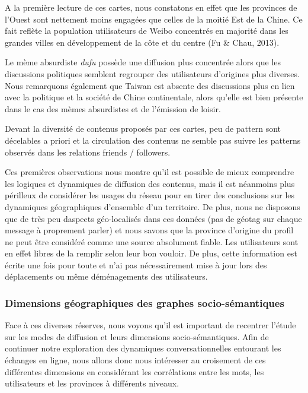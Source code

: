 A la premi\`ere lecture de ces cartes, nous constatons en effet que les
provinces de l{\textquoteright}Ouest sont nettement moins engag\'ees
que celles de la moiti\'e Est de la Chine. Ce fait refl\`ete la
population utilisateurs de Weibo concentr\'es en majorit\'e dans les
grandes villes en d\'eveloppement de la c\^ote et du centre (Fu \&
Chau, 2013). 

Le m\`eme absurdiste \textit{dufu }poss\`ede une diffusion plus
concentr\'ee alors que les discussions politiques semblent regrouper
des utilisateurs d{\textquoteright}origines plus diverses. Nous
remarquons \'egalement que Taiwan est absente des discussions plus en
lien avec la politique et la soci\'et\'e de Chine continentale, alors
qu{\textquoteright}elle est bien pr\'esente dans le cas des m\`emes
absurdistes et de l{\textquoteright}\'emission de loisir. 

Devant la diversit\'e de contenus propos\'es par ces cartes, peu de
pattern sont d\'ecelables a priori et la circulation des contenus ne
semble pas suivre les patterns observ\'es dans les relations friends /
followers.


Ces premi\`eres observations nous montre qu{\textquoteright}il est
possible de mieux comprendre les logiques et dynamiques de diffusion
des contenus, mais il est n\'eanmoins plus p\'erilleux de consid\'erer
les usages du r\'eseau pour en tirer des conclusions sur les dynamiques
g\'eographiques d{\textquoteright}ensemble d{\textquoteright}un
territoire. De plus, nous ne disposons que de tr\`es peu
d{\textquotesingle}aspects
{\textquotedbl}g\'eo-localis\'es{\textquotedbl} dans ces donn\'ees (pas
de g\'eotag sur chaque message \`a proprement parler) et nous savons
que la province d{\textquoteright}origine du profil ne peut \^etre
consid\'er\'e comme une source absolument fiable. Les utilisateurs sont
en effet libres de la remplir selon leur bon vouloir. De plus, cette
information est \'ecrite une fois pour toute et n{\textquoteright}ai
pas n\'ecessairement mise \`a jour lors des d\'eplacements ou m\^eme
d\'em\'enagements des utilisateurs.


\subsubsection{Dimensions g\'eographiques des graphes socio-s\'emantiques}
Face \`a ces diverses r\'eserves, nous voyons qu{\textquoteright}il est
important de recentrer l{\textquoteright}\'etude sur les modes de
diffusion et leurs dimensions socio-s\'emantiques. Afin de continuer
notre exploration des dynamiques conversationnelles entourant les
\'echanges en ligne, nous allons donc nous int\'eresser au croisement
de ces diff\'erentes dimensions en consid\'erant les corr\'elations
entre les mots, les utilisateurs et les provinces \`a diff\'erents
niveaux.


